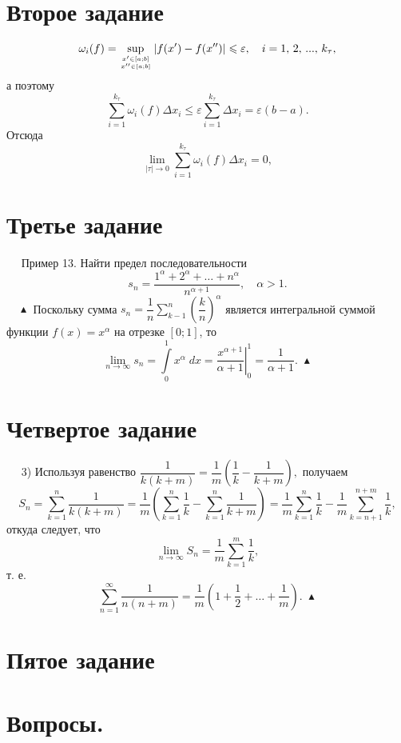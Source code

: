 \documentclass[a4paper,12pt]{article} %
\begin{document}
	\section{Второе задание}
	$$
		\omega_i(f) = \sup \limits_{x' \in \left[a ; b\right] \atop x'' \in \left[a ; b\right]} |f(x') -f(x'')| \leqslant \varepsilon, \quad
		i=1,\, 2, \, ... , \, k_\tau,
	$$
	а поэтому
	$$
		\sum \limits_{i=1}^{k_\tau} \omega_i(f) \Delta x_i \leqslant \varepsilon 
		\sum \limits_{i=1}^{k_\tau} \Delta x_i = 
		\varepsilon \left(b - a\right).
	$$
	Отсюда
	$$
		\lim \limits_{| \tau | \to 0} \sum \limits_{i=1}^{k_\tau} \omega_i(f) \Delta x_i = 0,
	$$
	
	\section{Третье задание}
	$\quad$ Пример 13. Найти предел последовательности 
	$$
		s_n = \dfrac{1^{\alpha} + 2^{\alpha} + \dots + n^{\alpha}}{n^{\alpha + 1}}, \quad \alpha > 1.
	$$
	$\quad \blacktriangle$ Поскольку сумма $s_n \! = \dfrac{1}{n} \displaystyle \sum \limits_{k-1}^n \left( \dfrac{k}{n} \right)^ \alpha$ является интегральной суммой функции
	$f(x) = x^{\alpha}$ на отрезке $\left[0; 1\right]$, то
	$$
		\lim \limits_{n \to \infty} s_n = 
		\int \limits_0^1 x^{\alpha} \; dx = 
		\left. \dfrac{x^{\alpha + 1}}{\alpha + 1} \right|_0^1 =
		\dfrac{1}{\alpha + 1}. \; \blacktriangle
	$$
	
	\section{Четвертое задание}
	$\quad$ 3) Используя равенство
	$
		\dfrac{1}{k \left(k + m\right)} = \dfrac{1}{m}
		\left( \dfrac{1}{k} - \dfrac{1}{k + m} \right) \! ,
	$
	получаем
	$$
		S_n = \sum \limits_{k = 1}^n \dfrac{1}{k \left(k + m\right)} = 
		\dfrac{1}{m} \left( \sum \limits_{k=1}^n \dfrac{1}{k} - \sum \limits_{k=1}^n \dfrac{1}{k + m} \right) = 
		\dfrac{1}{m} \sum \limits_{k = 1}^n \dfrac{1}{k} -
		\dfrac{1}{m} \sum \limits_{k = n + 1}^{n + m} \dfrac{1}{k},
	$$
	откуда следует, что
	$$
		\lim \limits_{n \to \infty} S_n = \dfrac{1}{m} \sum \limits_{k=1}^m \dfrac{1}{k},
	$$
	т. е.
	$$
		\sum \limits_{n = 1}^{\infty} \dfrac{1}{n \left(n + m\right)} =
		\dfrac{1}{m} \left(1 + \dfrac{1}{2} + \dots + \dfrac{1}{m} \right) \! . \; \blacktriangle
	$$
	
	\section{Пятое задание}
	
	
	\newpage
	\section{Вопросы.}
\end{document}

